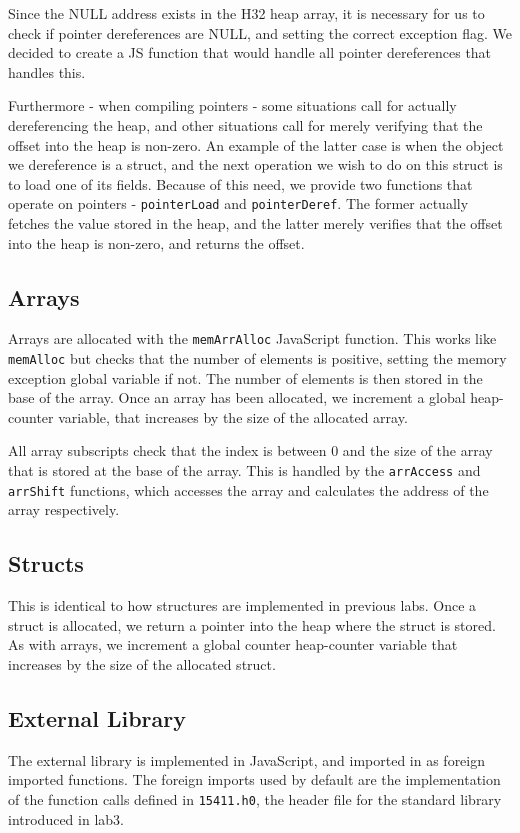 \documentclass[twoside]{article}
\begin{document}
\begin{multicols}{2}
    Since the NULL address exists in the H32 heap array, it is necessary for
    us to check if pointer dereferences are NULL, and setting the correct
    exception flag. We decided to create a JS function that would handle all
    pointer dereferences that handles this. 

    Furthermore - when compiling pointers - some situations call for actually
    dereferencing the heap, and other situations call for merely verifying that 
    the offset into the heap is non-zero. An example of the latter case is when
    the object we dereference is a struct, and the next operation we wish to do
    on this struct is to load one of its fields. Because of this need, we provide
    two functions that operate on pointers - \texttt{pointerLoad} and \texttt{pointerDeref}. 
    The former actually fetches the value stored in the heap, and the latter
    merely verifies that the offset into the heap is non-zero, and returns the offset. 

  \subsection{Arrays}
    Arrays are allocated with the \texttt{memArrAlloc} JavaScript function. This
    works like \texttt{memAlloc} but checks that the number of elements is
    positive, setting the memory exception global variable if not. The number of elements
    is then stored in the base of the array. Once an array has been allocated, we increment
    a global heap-counter variable, that increases by the size of the allocated array.

    All array subscripts check that the index is between 0 and the size of the
    array that is stored at the base of the array. This is handled by the
    \texttt{arrAccess} and \texttt{arrShift} functions, which accesses the array
    and calculates the address of the array respectively.

  \subsection{Structs}
    This is identical to how structures are implemented in previous labs. Once a struct
    is allocated, we return a pointer into the heap where the struct is stored. As with
    arrays, we increment a global counter heap-counter variable that increases by the 
    size of the allocated struct. 

  \subsection{External Library}
    The external library is implemented in JavaScript, and imported in as foreign
    imported functions. The foreign imports used by default are the implementation 
    of the function calls defined in \texttt{15411.h0}, the header file for the 
    standard library introduced in lab3. 


\end{multicols}
\end{document}
